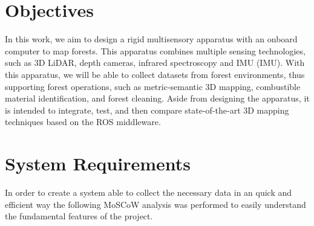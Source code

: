\section{Objectives}
In this work, we aim to design a rigid multisensory apparatus with an onboard computer to map forests. This apparatus combines multiple sensing technologies, such as 3D \acs{LiDAR}, depth cameras, infrared spectroscopy and \acl{IMU} (\acs{IMU}). With this apparatus, we will be able to collect datasets from forest environments, thus supporting forest operations, such as metric-semantic 3D mapping, combustible material identification, and forest cleaning. Aside from designing the apparatus, it is intended to integrate, test, and then compare state-of-the-art 3D mapping techniques based on the ROS middleware.

\section{System Requirements}

In order to create a system able to collect the necessary data in an quick and efficient way the following MoSCoW analysis was performed to easily understand the fundamental features of the project.

